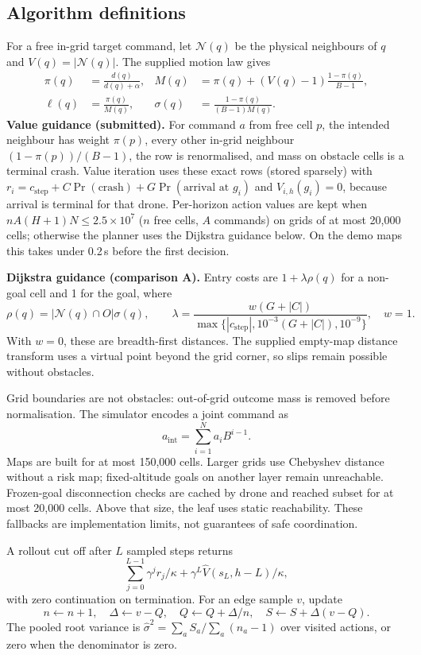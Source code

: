 \subsection{Algorithm definitions}
\label{app:guidance}
For a free in-grid target command, let $\mathcal N(q)$ be the physical
neighbours of $q$ and $V(q)=|\mathcal N(q)|$. The supplied motion law gives
\[
 \begin{aligned}
 \pi(q)&=\frac{d(q)}{d(q)+\alpha},&
 M(q)&=\pi(q)+(V(q)-1)\frac{1-\pi(q)}{B-1},\\
 \ell(q)&=\frac{\pi(q)}{M(q)},&
 \sigma(q)&=\frac{1-\pi(q)}{(B-1)M(q)}.
 \end{aligned}
\]
\textbf{Value guidance (submitted).} For command $a$ from free cell $p$, the
intended neighbour has weight $\pi(p)$, every other in-grid neighbour
$(1-\pi(p))/(B-1)$, the row is renormalised, and mass on obstacle cells is a
terminal crash. Value iteration uses these exact rows (stored sparsely) with
$r_i=c_{\mathrm{step}}+C\Pr(\text{crash})+G\Pr(\text{arrival at }g_i)$ and
$V_{i,h}(g_i)=0$, because arrival is terminal for that drone. Per-horizon
action values are kept when $nA(H+1)N\le2.5\times10^7$ ($n$ free cells, $A$
commands) on grids of at most 20,000 cells; otherwise the planner uses the
Dijkstra guidance below. On the demo maps this takes under 0.2\,s before
the first decision.

\textbf{Dijkstra guidance (comparison A).} Entry costs are
$1+\lambda\rho(q)$ for a non-goal cell and 1 for the goal, where
\[
 \rho(q)=|\mathcal N(q)\cap O|\sigma(q),\qquad
 \lambda=\frac{w(G+|C|)}
 {\max\{|c_{\mathrm{step}}|,10^{-3}(G+|C|),10^{-9}\}},\quad w=1.
\]
With $w=0$, these are breadth-first distances. The supplied empty-map
distance transform uses a virtual point beyond the grid corner, so slips
remain possible without obstacles.

Grid boundaries are not obstacles: out-of-grid outcome mass is removed
before normalisation. The simulator encodes a joint command as
\[
 a_{\mathrm{int}}=\sum_{i=1}^{N}a_iB^{i-1}.
\]
Maps are built for at most 150,000 cells. Larger grids use Chebyshev
distance without a risk map; fixed-altitude goals on another layer
remain unreachable. Frozen-goal disconnection checks are cached by
drone and reached subset for at most 20,000 cells. Above that size,
the leaf uses static reachability. These fallbacks are implementation
limits, not guarantees of safe coordination.

A rollout cut off after $L$ sampled steps returns
\[
 \sum_{j=0}^{L-1}\gamma^j r_j/\kappa+
 \gamma^L\widehat V(s_L,h-L)/\kappa,
\]
with zero continuation on termination. For an edge sample $v$, update
\[
 n\gets n+1,\quad \Delta\gets v-Q,\quad
 Q\gets Q+\Delta/n,\quad S\gets S+\Delta(v-Q).
\]
The pooled root variance is $\hat\sigma^2=\sum_a S_a/\sum_a(n_a-1)$ over
visited actions, or zero when the denominator is zero.

